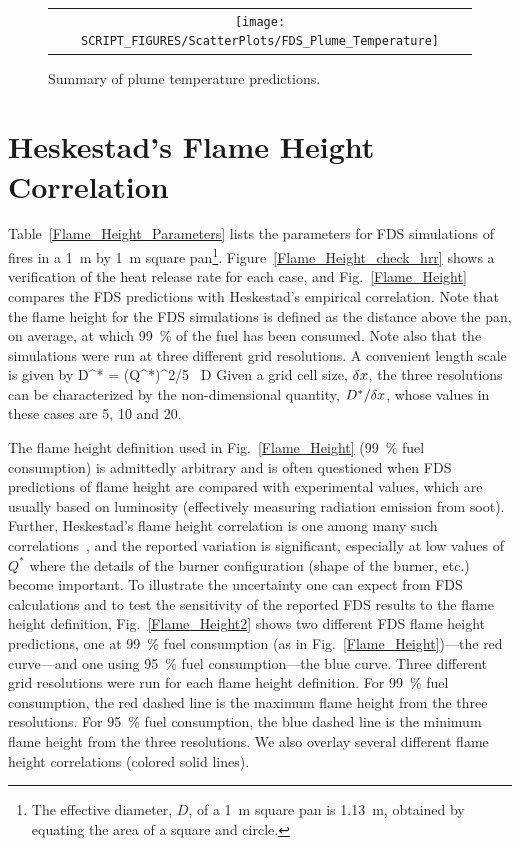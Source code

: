 \begin{figure}[h!]
\begin{center}
\begin{tabular}{c}
\texttt{[image: SCRIPT\_FIGURES/ScatterPlots/FDS\_Plume\_Temperature]} 
\end{tabular}
\end{center}
\caption[Summary of plume temperature predictions]
{Summary of plume temperature predictions.}
\label{Plume_Summary}
\end{figure}

\clearpage


\section{Heskestad's Flame Height Correlation}

Table~\ref{Flame_Height_Parameters} lists the parameters for FDS simulations of fires in a 1~m by 1~m square pan\footnote{The effective diameter, $D$, of a 1~m square pan is 1.13~m, obtained by equating the area of a square and circle.}. Figure~\ref{Flame_Height_check_hrr} shows a verification of the heat release rate for each case, and Fig.~\ref{Flame_Height} compares the FDS predictions with Heskestad's empirical correlation. Note that the flame height for the FDS simulations is defined as the distance above the pan, on average, at which 99~\% of the fuel has been consumed. Note also that the simulations were run at three different grid resolutions. A convenient length scale is given by
\be
   D^* = (Q^*)^{2/5} \, D
\ee
Given a grid cell size, $\delta x$, the three resolutions can be characterized by the non-dimensional quantity, $D^*/\delta x$, whose values in these cases are 5, 10 and 20.

The flame height definition used in Fig.~\ref{Flame_Height} (99~\% fuel consumption) is admittedly arbitrary and is often questioned when FDS predictions of flame height are compared with experimental values, which are usually based on luminosity (effectively measuring radiation emission from soot).  Further, Heskestad's flame height correlation is one among many such correlations~\cite{SFPE:Heskestad,Steward:1970,Becker:1978,Cox:1985,Hasemi:1984,Cetegen:1984,Delichatsios:1984}, and the reported variation is significant, especially at low values of $Q^*$ where the details of the burner configuration (shape of the burner, etc.) become important.  To illustrate the uncertainty one can expect from FDS calculations and to test the sensitivity of the reported FDS results to the flame height definition, Fig.~\ref{Flame_Height2} shows two different FDS flame height predictions, one at 99~\% fuel consumption (as in Fig.~\ref{Flame_Height})---the red curve---and one using 95~\% fuel consumption---the blue curve.  Three different grid resolutions were run for each flame height definition.  For 99~\% fuel consumption, the red dashed line is the maximum flame height from the three resolutions.  For 95~\% fuel consumption, the blue dashed line is the minimum flame height from the three resolutions.  We also overlay several different flame height correlations (colored solid lines).

